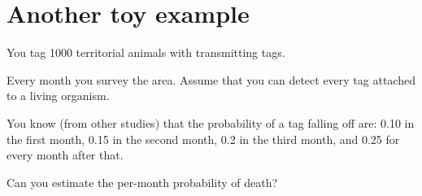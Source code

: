 \documentclass[landscape]{foils}
\begin{document}








\myNewSlide
\section*{Another toy example}
You tag 1000 territorial animals with transmitting tags.

Every month you survey the area.
Assume that you can detect every tag attached to a living organism.

You know (from other studies) that the probability of a tag falling off are:
0.10 in the first month, 0.15 in the second month, 0.2 in the third month, and
0.25 for every month after that.

Can you estimate the per-month probability of death?
\end{document}
